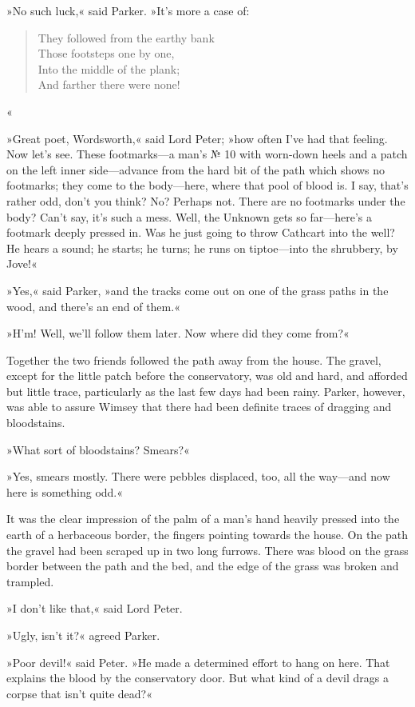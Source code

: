 »No such luck,« said Parker. »It's more a case of:
\begin{verse}
They followed from the earthy bank\\
Those footsteps one by one,\\
Into the middle of the plank;\\
And farther there were none!\end{verse}«

»Great poet, Wordsworth,« said Lord Peter; »how often I've had that feeling. Now let's see. These footmarks—a man's № 10 with worn-down heels and a patch on the left inner side—advance from the hard bit of the path which shows no footmarks; they come to the body—here, where that pool of blood is. I say, that's rather odd, don't you think? No? Perhaps not. There are no footmarks under the body? Can't say, it's such a mess. Well, the Unknown gets so far—here's a footmark deeply pressed in. Was he just going to throw Cathcart into the well? He hears a sound; he starts; he turns; he runs on tiptoe—into the shrubbery, by Jove!«

»Yes,« said Parker, »and the tracks come out on one of the grass paths in the wood, and there's an end of them.«

»H'm! Well, we'll follow them later. Now where did they come from?«

Together the two friends followed the path away from the house. The gravel, except for the little patch before the conservatory, was old and hard, and afforded but little trace, particularly as the last few days had been rainy. Parker, however, was able to assure Wimsey that there had been definite traces of dragging and bloodstains.

»What sort of bloodstains? Smears?«

»Yes, smears mostly. There were pebbles displaced, too, all the way—and now here is something odd.«

It was the clear impression of the palm of a man's hand heavily pressed into the earth of a herbaceous border, the fingers pointing towards the house. On the path the gravel had been scraped up in two long furrows. There was blood on the grass border between the path and the bed, and the edge of the grass was broken and trampled.

»I don't like that,« said Lord Peter.

»Ugly, isn't it?« agreed Parker.

»Poor devil!« said Peter. »He made a determined effort to hang on here. That explains the blood by the conservatory door. But what kind of a devil drags a corpse that isn't quite dead?«

